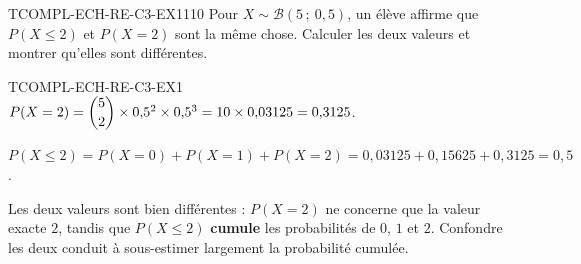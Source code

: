 

\begin{exercice}{TCOMPL-ECH-RE-C3-EX1}{1}{10}
Pour $X\sim\mathcal{B}(5\,;\ 0{,}5)$, un élève affirme que $P(X\leq2)$ et $P(X=2)$ sont la même chose. Calculer les deux valeurs et montrer qu'elles sont différentes.
\end{exercice}


\begin{corrige}{TCOMPL-ECH-RE-C3-EX1}
$P(X=2) = \dbinom{5}{2}\times0{,}5^2\times0{,}5^3 = 10\times0{,}03125 = 0{,}3125$.

$P(X\leq2) = P(X=0)+P(X=1)+P(X=2) = 0{,}03125+0{,}15625+0{,}3125 = 0{,}5$.

Les deux valeurs sont bien différentes : $P(X=2)$ ne concerne que la valeur exacte $2$, tandis que $P(X\leq2)$ \textbf{cumule} les probabilités de $0$, $1$ et $2$. Confondre les deux conduit à sous-estimer largement la probabilité cumulée.
\end{corrige}
